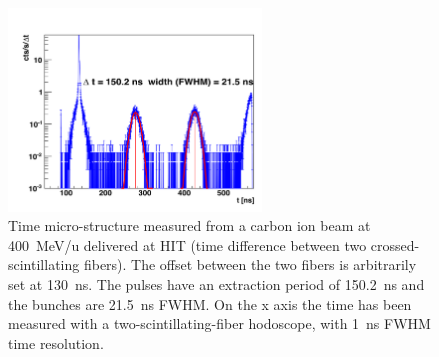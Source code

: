 \begin{figure} [!hbtp]	
  \centering
	\includegraphics[width=0.6\textwidth]{03_GraphicFiles/chapter4_HTsimu/BeamTimeStruct.png} 
  \caption{Time micro-structure measured from a carbon ion beam at 400~MeV/u delivered at HIT (time difference between two crossed-scintillating fibers). The offset between the two fibers is arbitrarily set at 130~ns. The pulses have an extraction period of 150.2~ns and the bunches are 21.5~ns FWHM.  On the x axis the time has been measured with a two-scintillating-fiber hodoscope, with 1~ns FWHM time resolution.}
  \label{chap4::fig::fig_HIT_timeStruct}
\end{figure}


